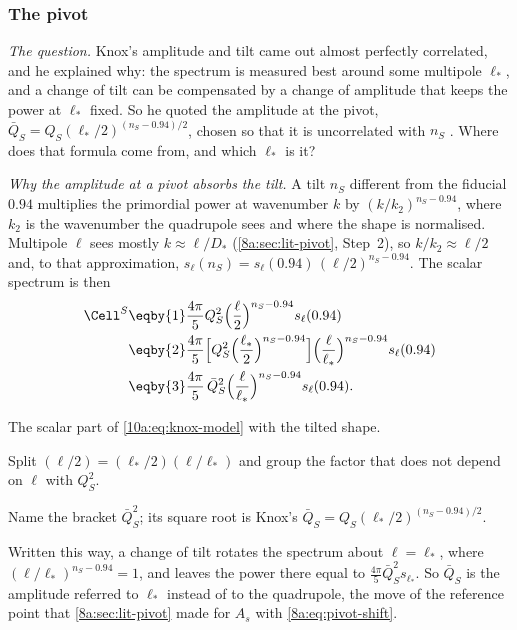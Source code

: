 \subsubsection*{The pivot}

\emph{The question.} Knox's amplitude and tilt came out almost perfectly correlated, and he explained why:
the spectrum is measured best around some multipole $\ell_*$, and a change of tilt can be compensated by a change
of amplitude that keeps the power at $\ell_*$ fixed. So he quoted the amplitude at the pivot,
$\bar Q_S=Q_S(\ell_*/2)^{(n_S-0.94)/2}$, chosen so that it is uncorrelated with $n_S$ . Where does
that formula come from, and which $\ell_*$ is it?

\emph{Why the amplitude at a pivot absorbs the tilt.} A tilt $n_S$ different from the fiducial $0.94$ multiplies the
primordial power at wavenumber $k$ by $(k/k_2)^{n_S-0.94}$, where $k_2$ is the wavenumber the quadrupole sees and
where the shape is normalised. Multipole $\ell$ sees mostly $k\approx\ell/D_*$ (\cref{8a:sec:lit-pivot}, Step~2), so
$k/k_2\approx\ell/2$ and, to that approximation, $s_\ell(n_S)=s_\ell(0.94)\,(\ell/2)^{n_S-0.94}$. The scalar spectrum is then
\begin{align*}
  \Cell^S
  &\eqby{1}\frac{4\pi}5Q_S^2\Bigl(\frac\ell2\Bigr)^{n_S-0.94}s_\ell(0.94)
  \\
  &\eqby{2}\frac{4\pi}5\Bigl[Q_S^2\Bigl(\frac{\ell_*}2\Bigr)^{n_S-0.94}\Bigr]\Bigl(\frac\ell{\ell_*}\Bigr)^{n_S-0.94}s_\ell(0.94)
  \\
  &\eqby{3}\frac{4\pi}5\,\bar Q_S^2\Bigl(\frac\ell{\ell_*}\Bigr)^{n_S-0.94}s_\ell(0.94).
\end{align*}
\begin{explain}
  \item The scalar part of \eqref{10a:eq:knox-model} with the tilted shape.
  \item Split $(\ell/2)=(\ell_*/2)(\ell/\ell_*)$ and group the factor that does not depend on $\ell$ with $Q_S^2$.
  \item Name the bracket $\bar Q_S^2$; its square root is Knox's $\bar Q_S=Q_S(\ell_*/2)^{(n_S-0.94)/2}$.
\end{explain}
Written this way, a change of tilt rotates the spectrum about $\ell=\ell_*$, where $(\ell/\ell_*)^{n_S-0.94}=1$, and leaves
the power there equal to $\frac{4\pi}5\bar Q_S^2s_{\ell_*}$. So $\bar Q_S$ is the amplitude referred to $\ell_*$ instead of to the
quadrupole, the move of the reference point that \cref{8a:sec:lit-pivot} made for $A_s$ with \eqref{8a:eq:pivot-shift}.

